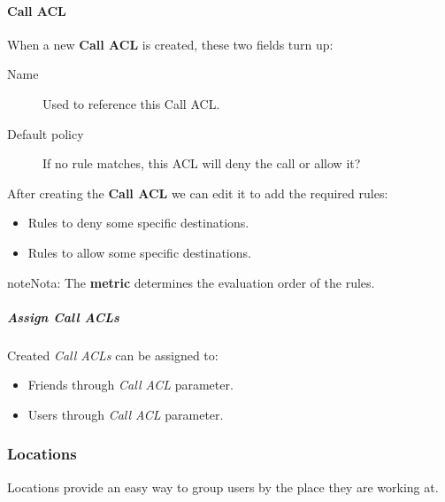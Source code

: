 \documentclass[letterpaper,10pt,spanish]{sphinxmanual}
\begin{document}
\paragraph{Call ACL}
\label{administration_portal/client/vpbx/user_configuration/call_acls:call-acl}
When a new \textbf{Call ACL} is created, these two fields turn up:
\begin{description}
\item[{Name}] \leavevmode{}\label{administration_portal/client/vpbx/user_configuration/call_acls:term-name}
Used to reference this Call ACL.

\item[{Default policy}] \leavevmode{}\label{administration_portal/client/vpbx/user_configuration/call_acls:term-default-policy}
If no rule matches, this ACL will deny the call or allow it?

\end{description}

After creating the \textbf{Call ACL} we can edit it to add the required rules:
\begin{itemize}
\item {} 
Rules to deny some specific destinations.

\item {} 
Rules to allow some specific destinations.

\end{itemize}

\begin{notice}{note}{Nota:}
The \textbf{metric} determines the evaluation order of the rules.
\end{notice}


\subparagraph{Assign Call ACLs}
\label{administration_portal/client/vpbx/user_configuration/call_acls:assign-call-acls}
Created \emph{Call ACLs} can be assigned to:
\begin{itemize}
\item {} 
Friends through \emph{Call ACL} parameter.

\item {} 
Users through \emph{Call ACL} parameter.

\end{itemize}


\subsubsection{Locations}
\label{administration_portal/client/vpbx/user_configuration/locations::doc}\label{administration_portal/client/vpbx/user_configuration/locations:locations}
Locations provide an easy way to group users by the place they are working at.
\end{document}
